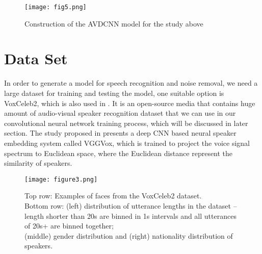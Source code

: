 \documentclass[runningheads,a4paper]{llncs}
\begin{document}
\begin{figure}[h!]
\texttt{[image: fig5.png]}
\caption{Construction of the AVDCNN model for the study above}
\label{fig:framework}
\end{figure}



\section{Data Set}

In order to generate a model for speech recognition and noise removal, we need a large dataset for training and testing the model, one suitable option is VoxCeleb2, which is also used in \cite{7}. It is an open-source media that contains huge amount of audio-visual speaker recognition dataset that we can use in our convolutional neural network training process, which will be discussed in later section. The study proposed in \cite{7} presents a deep CNN based neural speaker embedding system called VGGVox, which is trained to project the voice signal spectrum to Euclidean space, where the Euclidean distance represent the similarity of speakers.\\

\begin{figure}[h!]
\texttt{[image: figure3.png]}
\caption{Top row: Examples of faces from the VoxCeleb2 dataset.\\Bottom row: (left) distribution of utterance lengths in the dataset – length shorter than 20s are binned in 1s intervals and all utterances of 20s+ are binned together; \\(middle) gender distribution and (right) nationality distribution of speakers. \cite{7}}
\label{fig:framework}
\end{figure}
\end{document}
